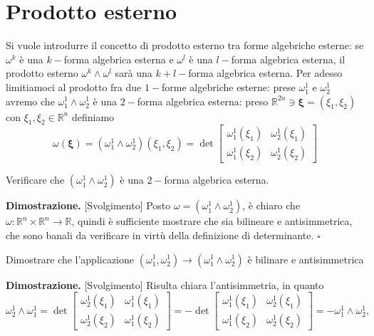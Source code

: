 \section{Prodotto esterno}
%
Si vuole introdurre il concetto di prodotto esterno tra forme algebriche esterne: se $\omega^k$ è una $k-$forma algebrica esterna e $\omega^l$ è una $l-$forma algebrica esterna, il prodotto esterno $\omega^k \wedge \omega^l$ sarà una $k + l-$forma algebrica esterna. Per adesso limitiamoci al prodotto fra due $1-$forme algebriche esterne: prese $\omega^1_1$ e $\omega^1_2$ avremo che $\omega_1^1 \wedge \omega_2^1$ è una $2-$forma algebrica esterna: preso $\mathbb{R}^{2n} \ni \mathbf{\xi} = (\xi_1, \xi_2)$ con $\xi_1, \xi_2 \in \mathbb{R}^n$ definiamo 
$$
\omega(\mathbf{\xi}) = (\omega_1^1 \wedge \omega_2^1)(\xi_1, \xi_2) = \det{\begin{bmatrix}
    \omega_1^1(\xi_1) & \omega_2^1(\xi_1) \\
    \omega_1^1(\xi_2) & \omega_2^1(\xi_2)
\end{bmatrix}}
$$
\begin{exercise}
    Verificare che $(\omega_1^1 \wedge \omega_2^1)$ è una $2-$forma algebrica esterna.
\end{exercise}
%
\noindent \textbf{Dimostrazione. } [Svolgimento]
    Posto $\omega = (\omega^1_1 \wedge \omega_2^1)$, è chiaro che $\omega: \mathbb{R}^n \times \mathbb{R}^n \to \mathbb{R}$, quindi è sufficiente mostrare che sia bilineare e antisimmetrica, che sono banali da verificare in virtù della definizione di determinante.
\hfill $\square$
%
\vspace{0.5cm}
\begin{exercise}
    Dimostrare che l'applicazione $(\omega_1^1, \omega_2^1) \to (\omega_1^1 \wedge \omega_2^1)$ è bilinare e antisimmetrica
\end{exercise}
%
\noindent \textbf{Dimostrazione. } [Svolgimento]
    Risulta chiara l'antisimmetria, in quanto
    $$
        \omega_2^1 \wedge \omega_1^1 = \det{\begin{bmatrix}
            \omega_2^1(\xi_1) & \omega_1^1(\xi_1) \\
            \omega_2^1(\xi_2) & \omega_1^1(\xi_2)
        \end{bmatrix}} = - \det{\begin{bmatrix}
            \omega_1^1(\xi_1) & \omega_2^1(\xi_1) \\
            \omega_1^1(\xi_2) & \omega_2^1(\xi_2)
        \end{bmatrix}} = - \omega_1^1 \wedge \omega_2^1,
    $$
